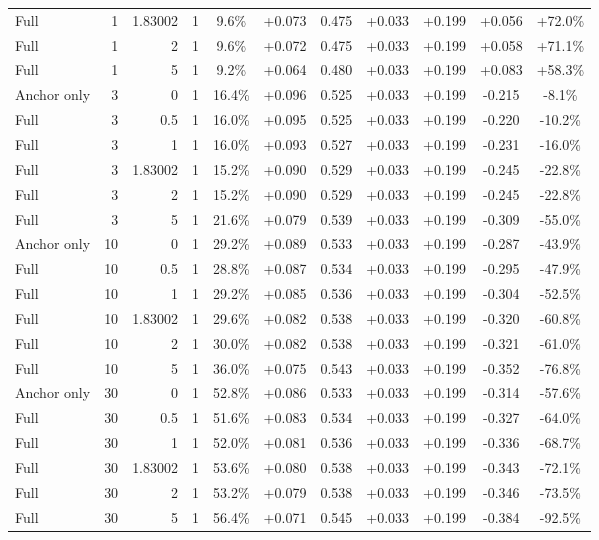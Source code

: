 \begin{table}[htbp]
\begin{tabular}{lrrrccccccc}
Full & 1 & 1.83002 & 1 & 9.6\% & +0.073 & 0.475 & +0.033 & +0.199 & +0.056 & +72.0\% \\
Full & 1 & 2 & 1 & 9.6\% & +0.072 & 0.475 & +0.033 & +0.199 & +0.058 & +71.1\% \\
Full & 1 & 5 & 1 & 9.2\% & +0.064 & 0.480 & +0.033 & +0.199 & +0.083 & +58.3\% \\
Anchor only & 3 & 0 & 1 & 16.4\% & +0.096 & 0.525 & +0.033 & +0.199 & -0.215 & -8.1\% \\
Full & 3 & 0.5 & 1 & 16.0\% & +0.095 & 0.525 & +0.033 & +0.199 & -0.220 & -10.2\% \\
Full & 3 & 1 & 1 & 16.0\% & +0.093 & 0.527 & +0.033 & +0.199 & -0.231 & -16.0\% \\
Full & 3 & 1.83002 & 1 & 15.2\% & +0.090 & 0.529 & +0.033 & +0.199 & -0.245 & -22.8\% \\
Full & 3 & 2 & 1 & 15.2\% & +0.090 & 0.529 & +0.033 & +0.199 & -0.245 & -22.8\% \\
Full & 3 & 5 & 1 & 21.6\% & +0.079 & 0.539 & +0.033 & +0.199 & -0.309 & -55.0\% \\
Anchor only & 10 & 0 & 1 & 29.2\% & +0.089 & 0.533 & +0.033 & +0.199 & -0.287 & -43.9\% \\
Full & 10 & 0.5 & 1 & 28.8\% & +0.087 & 0.534 & +0.033 & +0.199 & -0.295 & -47.9\% \\
Full & 10 & 1 & 1 & 29.2\% & +0.085 & 0.536 & +0.033 & +0.199 & -0.304 & -52.5\% \\
Full & 10 & 1.83002 & 1 & 29.6\% & +0.082 & 0.538 & +0.033 & +0.199 & -0.320 & -60.8\% \\
Full & 10 & 2 & 1 & 30.0\% & +0.082 & 0.538 & +0.033 & +0.199 & -0.321 & -61.0\% \\
Full & 10 & 5 & 1 & 36.0\% & +0.075 & 0.543 & +0.033 & +0.199 & -0.352 & -76.8\% \\
Anchor only & 30 & 0 & 1 & 52.8\% & +0.086 & 0.533 & +0.033 & +0.199 & -0.314 & -57.6\% \\
Full & 30 & 0.5 & 1 & 51.6\% & +0.083 & 0.534 & +0.033 & +0.199 & -0.327 & -64.0\% \\
Full & 30 & 1 & 1 & 52.0\% & +0.081 & 0.536 & +0.033 & +0.199 & -0.336 & -68.7\% \\
Full & 30 & 1.83002 & 1 & 53.6\% & +0.080 & 0.538 & +0.033 & +0.199 & -0.343 & -72.1\% \\
Full & 30 & 2 & 1 & 53.2\% & +0.079 & 0.538 & +0.033 & +0.199 & -0.346 & -73.5\% \\
Full & 30 & 5 & 1 & 56.4\% & +0.071 & 0.545 & +0.033 & +0.199 & -0.384 & -92.5\% \\

\end{tabular}
\end{table}
